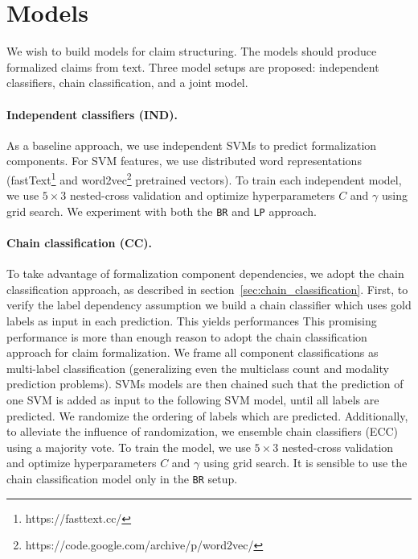 \section{Models}
\label{sec:claim_struc_models}

We wish to build models for claim structuring. The models should produce 
formalized claims from text. 
Three model setups are proposed: independent classifiers, 
chain classification, and a joint model. 

\paragraph{Independent classifiers (IND). }
As a baseline approach, we use independent SVMs to predict formalization
components.
For SVM features, we use distributed word representations
(fastText\footnote{https://fasttext.cc/}
and word2vec\footnote{https://code.google.com/archive/p/word2vec/}
pretrained vectors).
To train each independent model, we use $5 \times 3$ nested-cross validation
and optimize hyperparameters $C$ and $\gamma$ using grid search. 
We experiment with both the \texttt{BR} and \texttt{LP} approach.

\paragraph{Chain classification (CC). }
To take advantage of formalization component dependencies, we adopt the chain
classification approach, as described in
section~\ref{sec:chain_classification}.
First, to verify the label dependency assumption we build a chain classifier
which uses gold  labels as input in each prediction.  
This yields performances 
This promising performance is more than enough reason to adopt the
chain classification approach for claim formalization. 
We frame all component classifications as multi-label classification 
(generalizing even the multiclass count and modality prediction problems).
SVMs models are then chained such that the prediction of one SVM is added as
input to the following SVM model, until all labels are predicted. We randomize 
the ordering of labels which are predicted.
Additionally, to alleviate the influence of randomization, we 
ensemble chain classifiers (ECC) using a majority vote. 
To train the model, we use $5 \times 3$ nested-cross validation
and optimize hyperparameters $C$ and $\gamma$ using grid search. 
It is sensible to use the chain classification model only in the
\texttt{BR} setup.

